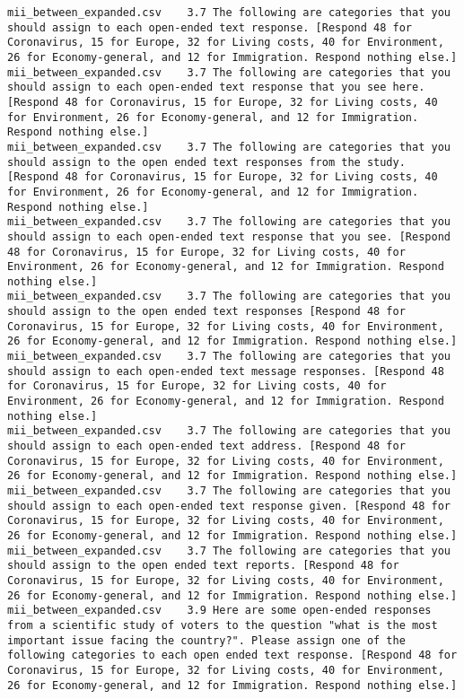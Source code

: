 \begin{lstlisting}[label=lst:promptvariants]
mii_between_expanded.csv	3.7	The following are categories that you should assign to each open-ended text response. [Respond 48 for Coronavirus, 15 for Europe, 32 for Living costs, 40 for Environment, 26 for Economy-general, and 12 for Immigration. Respond nothing else.]
mii_between_expanded.csv	3.7	The following are categories that you should assign to each open-ended text response that you see here. [Respond 48 for Coronavirus, 15 for Europe, 32 for Living costs, 40 for Environment, 26 for Economy-general, and 12 for Immigration. Respond nothing else.]
mii_between_expanded.csv	3.7	The following are categories that you should assign to the open ended text responses from the study. [Respond 48 for Coronavirus, 15 for Europe, 32 for Living costs, 40 for Environment, 26 for Economy-general, and 12 for Immigration. Respond nothing else.]
mii_between_expanded.csv	3.7	The following are categories that you should assign to each open-ended text response that you see. [Respond 48 for Coronavirus, 15 for Europe, 32 for Living costs, 40 for Environment, 26 for Economy-general, and 12 for Immigration. Respond nothing else.]
mii_between_expanded.csv	3.7	The following are categories that you should assign to the open ended text responses [Respond 48 for Coronavirus, 15 for Europe, 32 for Living costs, 40 for Environment, 26 for Economy-general, and 12 for Immigration. Respond nothing else.]
mii_between_expanded.csv	3.7	The following are categories that you should assign to each open-ended text message responses. [Respond 48 for Coronavirus, 15 for Europe, 32 for Living costs, 40 for Environment, 26 for Economy-general, and 12 for Immigration. Respond nothing else.]
mii_between_expanded.csv	3.7	The following are categories that you should assign to each open-ended text address. [Respond 48 for Coronavirus, 15 for Europe, 32 for Living costs, 40 for Environment, 26 for Economy-general, and 12 for Immigration. Respond nothing else.]
mii_between_expanded.csv	3.7	The following are categories that you should assign to each open-ended text response given. [Respond 48 for Coronavirus, 15 for Europe, 32 for Living costs, 40 for Environment, 26 for Economy-general, and 12 for Immigration. Respond nothing else.]
mii_between_expanded.csv	3.7	The following are categories that you should assign to the open ended text reports. [Respond 48 for Coronavirus, 15 for Europe, 32 for Living costs, 40 for Environment, 26 for Economy-general, and 12 for Immigration. Respond nothing else.]
mii_between_expanded.csv	3.9	Here are some open-ended responses from a scientific study of voters to the question "what is the most important issue facing the country?". Please assign one of the following categories to each open ended text response. [Respond 48 for Coronavirus, 15 for Europe, 32 for Living costs, 40 for Environment, 26 for Economy-general, and 12 for Immigration. Respond nothing else.]

\end{lstlisting}
